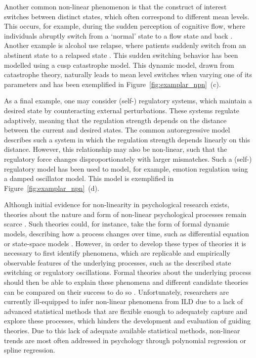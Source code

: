 \documentclass[man, floatsintext]{apa7}
\begin{document}
Another common non-linear phenomenon is that the construct of interest
switches between distinct states, which often correspond to different mean
levels. This occurs, for example, during the sudden perception of cognitive
flow, where individuals abruptly switch from a `normal' state to a flow state
and back \parencite{ceja_suddenly_2012}. Another example is alcohol use
relapse, where patients suddenly switch from an abstinent state to a relapsed
state \parencite{witkiewitz_modeling_2007}. This sudden switching behavior has
been modelled using a cusp catastrophe model. This dynamic model, drawn from
catastrophe theory, naturally leads to mean level switches when varying one
of its parameters \parencite{van_der_maas_sudden_2003,chow_cusp_2015}
and has been exemplified in Figure~\ref{fig:examplar_npn}~(c).

As a final example, one may consider (self-) regulatory systems, which maintain
a desired state by counteracting external perturbations. These systems regulate
adaptively, meaning that the regulation strength depends on the distance
between the
current and desired states. The common autoregressive model describes such a
system in which the regulation strength depends linearly on this distance.
However, this relationship may also be non-linear, such that the
regulatory force changes disproportionately with larger mismatches. Such
a (self-) regulatory model has been used to model, for example, emotion
regulation \parencite{chow_emotion_2005} using a damped oscillator model.
This model is exemplified in Figure~\ref{fig:examplar_npn}~(d).

Although initial evidence for non-linearity in psychological research exists,
theories about the nature and form of non-linear psychological processes remain
scarce \parencite{tan_time-varying_2011}. Such theories could, for instance,
take the form of formal dynamic models, describing how a process changes over
time, such as differential equation \parencite{cooper_dynamical_2012} or
state-space models \parencite{durbin_time_2012}. However, in order
to develop these types of theories it is
necessary to first identify phenomena, which are replicable and empirically
observable features of the underlying processes, such as the described
state switching or regulatory oscillations. Formal theories about the
underlying process should then be able to explain these phenomena and different
candidate theories can be compared on their success to do so
\parencite{borsboom_theory_2021}.
Unfortunately, researchers are currently ill-equipped to infer non-linear
phenomena from ILD due to a lack of advanced statistical methods that are
flexible enough to adequately capture and explore these processes, which
hinders the development and evaluation of guiding theories.
Due to this lack of adequate available statistical methods,
non-linear trends are most often addressed in psychology through polynomial
regression or spline regression.
\end{document}
